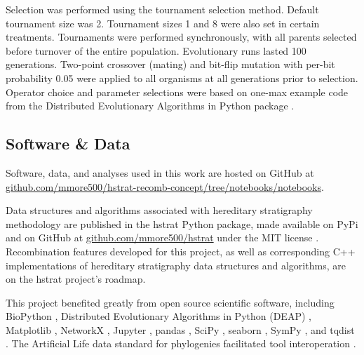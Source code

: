 Selection was performed using the tournament selection method.
Default tournament size was 2.
Tournament sizes 1 and 8 were also set in certain treatments.
Tournaments were performed synchronously, with all parents selected before turnover of the entire population.
Evolutionary runs lasted 100 generations.
Two-point crossover (mating) and bit-flip mutation with per-bit probability 0.05 were applied to all organisms at all generations prior to selection.
Operator choice and parameter selections were based on one-max example code from the Distributed Evolutionary Algorithms in Python package \citep{fortin2012deap}.







\subsection{Software \& Data}
\label{sec:software-data}

Software, data, and analyses used in this work are hosted on GitHub at \url{github.com/mmore500/hstrat-recomb-concept/tree/notebooks/notebooks}.

Data structures and algorithms associated with hereditary stratigraphy methodology are published in the hstrat Python package, made available on PyPi and on GitHub at \url{github.com/mmore500/hstrat} under the MIT license \citep{moreno2022hstrat}.
Recombination features developed for this project, as well as corresponding C++ implementations of hereditary stratigraphy data structures and algorithms, are on the hstrat project's roadmap.

This project benefited greatly from open source scientific software, including BioPython \citep{cock2009biopython}, Distributed Evolutionary Algorithms in Python (DEAP) \citep{fortin2012deap}, Matplotlib \citep{hunter2007matplotlib}, NetworkX \citep{hagberg2008networkx}, Jupyter \citep{loizides2016jupyter}, pandas \citep{reback2020pandas,mckinney2010pandas}, SciPy \citep{pauli2020scipy}, seaborn \citep{waskom2021seaborn}, SymPy \citep{meurer2017sympy}, and tqdist \citep{sand2014tqdist}.
The Artificial Life data standard for phylogenies facilitated tool interoperation \citep{lalejini2019data}.
